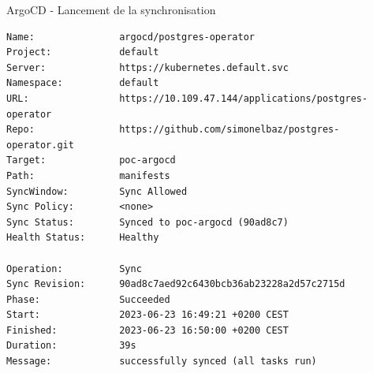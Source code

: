 \begin{frame}[fragile,shrink=1]{ArgoCD - Lancement de la synchronisation}

\begin{tiny}
\begin{Verbatim}[commandchars=\\\{\}]
Name:               argocd/postgres-operator
Project:            default
Server:             https://kubernetes.default.svc
Namespace:          default
URL:                https://10.109.47.144/applications/postgres-operator
Repo:               https://github.com/simonelbaz/postgres-operator.git
Target:             poc-argocd
Path:               manifests
SyncWindow:         Sync Allowed
Sync Policy:        <none>
Sync Status:        Synced to poc-argocd (90ad8c7)
Health Status:      Healthy

Operation:          Sync
Sync Revision:      90ad8c7aed92c6430bcb36ab23228a2d57c2715d
Phase:              Succeeded
Start:              2023-06-23 16:49:21 +0200 CEST
Finished:           2023-06-23 16:50:00 +0200 CEST
Duration:           39s
Message:            successfully synced (all tasks run)


\end{Verbatim}
\end{tiny}
\end{frame}
